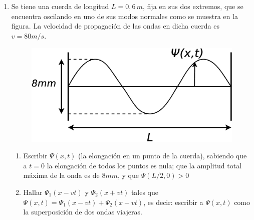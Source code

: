 \documentclass[11pt,spanish,a4paper]{article}
\begin{document}
\begin{enumerate}
\item Se tiene una cuerda de longitud $L=0,6\unit{\, m}$, fija en sus dos
extremos, que se encuentra oscilando en uno de sus modos normales
como se muestra en la figura. La velocidad de propagación de las ondas
en dicha cuerda es \(v=80 \unit{m/s}\).
\begin{figure}[H]
\centering{}\includegraphics[clip,scale=0.25]{ej1-32}
\end{figure}
\begin{enumerate}
	\item Escribir $\Psi(x,t)$ (la elongación en un punto de la cuerda), sabiendo que a $t=0$ la elongación de todos los puntos es nula; que la amplitud total máxima de la onda es de \(8\unit{mm}\), y que $\dot{\Psi}(L/2,0)>0$
	\item Hallar $\Psi_{1}(x-vt)$ y $\Psi_{2}(x+vt)$ tales que $\Psi(x,t)=\Psi_{1}(x-vt)+\Psi_{2}(x+vt)$,
es decir: escribir a $\Psi(x,t)$ como la superposición de dos ondas
viajeras.
\end{enumerate}




\end{enumerate}
\end{document}
